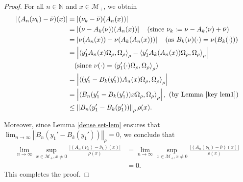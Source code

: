 \documentclass[11pt]{amsart}
\theoremstyle{definition}
\theoremstyle{myremark}
\numberwithin{equation}{section}
\def\N{\mathbb N}
\newcommand{\CM}{\mathcal{M}}
\newcommand{\abs}[1]{\left\vert#1\right\vert}
\newcommand{\norm}[1]{\left\Vert#1\right\Vert}
\newcommand\inner[2]{\left\langle #1, #2 \right\rangle}
\begin{document}
\begin{proof}
	\noindent For all $n \in \N$ and $x \in \CM_+$, we obtain 
	\begin{align*}
		\abs{(A_{n}(\nu_k) - \bar{\nu})(x)}
		&= \abs{(\nu_k - \bar{\nu})(A_{n}(x))} \\
		&= \abs{(\nu - A_{k}(\nu))(A_{n}(x))}  \quad \text{(since } \nu_k := \nu - A_{k}(\nu ) + \bar{\nu}) \\
		&= \abs{\nu(A_{n}(x)) - \nu(A_{k}(A_{n}(x)))}  \quad \text{(as } B_{k}(\nu)(\cdot) = \nu(B_{k}(\cdot)))\\
		&= \abs{\inner{y_1' A_{n}(x) \Omega_{\rho} }{\Omega_{\rho}}_{\rho} - \inner{y_1' A_{k}(A_{n}(x))\Omega_{\rho}}{\Omega_{\rho}}_{\rho}} \\
		&\quad \text{(since } \nu(\cdot) = \inner{y_1' (\cdot)\Omega_{\rho}}{ \Omega_{\rho}}_{\rho}) \\
		&= \abs{\inner{(y_1'- B_{k}(y_1'))A_{n}(x) \Omega_{\rho}}{\Omega_{\rho}}_{\rho}} \\
		&= \abs{\inner{B_{n}(y_1'- B_{k}(y_1'))x \Omega_{\rho}}{\Omega_{\rho}}_{\rho}}, \text{ (by Lemma } \ref{key lem1}) \\
		&\leq \norm{B_{n}(y_1'- B_{k}(y_1'))}_{\rho} \rho(x).
	\end{align*}
	
	\noindent Moreover, since Lemma \ref{dense set-lem} ensures that $\lim_{n \to \infty} \norm{B_{n}(y_1'- B_{k}(y_1'))}_{\rho}=0$, we conclude that
	\begin{align*}
		\lim_{n \to \infty} \sup_{x \in \CM_+, x \neq 0} \frac{\abs{(A_{n}(\nu_k)- \bar{\nu}_k)(x)}}{\rho(x)}
		&= \lim_{n \to \infty} \sup_{x \in \CM_+, x \neq 0} \frac{\abs{(A_{n}(\nu_k)- \bar{\nu})(x)}}{\rho(x)} \\
		&= 0.
	\end{align*}
	This completes the proof.		
\end{proof}
\end{document}
